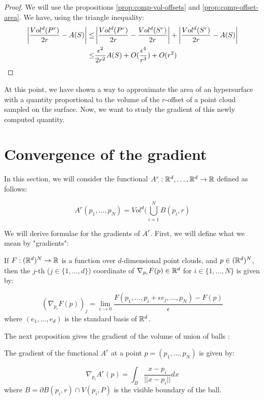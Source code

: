 \begin{proof}
    We will use the propositions \ref{prop:comp-vol-offsets} and
    \ref{prop:comp-offset-area}. We have, using the triangle inequality:
    \begin{align*}
        \left| \frac{Vol^d(P^r)}{2r} - A(S) \right| \leq& \left| \frac{Vol^d(P^r)}{2r} -
            \frac{Vol^d(S^r)}{2r} \right| + \left| \frac{Vol^d(S^r)}{2r} -
            A(S) \right| \\
        \leq& \frac{\epsilon^2}{2r^2} A(S) + O(\frac{\epsilon^4}{r^3}) + O(r^2)
        \qedhere
    \end{align*}
\end{proof}

At this point, we have shown a way to approximate the area of an hypersurface
with a quantity proportional to the volume of the $r$-offset of a point cloud
sampled on the surface.
Now, we want to study the gradient of this newly computed quantity.

\section{Convergence of the gradient}

In this section, we will consider the functional $ A^r : \mathbb{R}^d, \hdots, \mathbb{R}^d \to
\mathbb{R} $ defined as follows:

\begin{equation}
    A^r(p_1, \ldots, p_N) = Vol^d(\bigcup_{i=1}^N B(p_i, r)
\end{equation}

We will derive formulae for the gradients of $ A^r $. First, we will define what
we mean by "gradients":

\begin{definition}
    If $ F : (\mathbb{R}^d)^N \to \mathbb{R} $ is a function over $d$-dimensional point clouds,
    and $ p \in (\mathbb{R}^d)^N $, then the $j$-th ($ j \in \{1, \ldots, d\} $)
    coordinate of $ \nabla_{p_i} F(p) \in \mathbb{R}^d $ for $ i \in \{1, \ldots, N\} $
    is given by:

    $$ (\nabla_{p_i} F(p))_j = \lim\limits_{\epsilon\to 0} \frac{F(p_1,\ldots,p_i+
    \epsilon e_j, \ldots, p_N) - F(p)}{\epsilon} $$
    where $ (e_1, \ldots, e_d) $ is the standard basis of $ \mathbb{R}^d $.
\end{definition}

The next proposition gives the gradient of the volume of union of balls :
\begin{proposition}
    The gradient of the functional $ A^r $ at a point $ p = (p_1, \ldots, p_N) $
    is given by:

    \begin{equation}
        \label{eqn:gradient_area_2d}
        \nabla_{p_i} A^r(p) = \int_{B} \frac{x - p_i}{||x - p_i||} dx
    \end{equation}
    where $ B = \partial B(p_i, r) \cap V(p_i, P) $ is the visible boundary of
    the ball.
\end{proposition}

